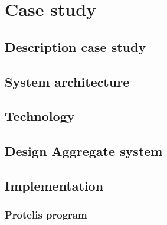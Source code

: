 \chapter{Case study}
\label{chap:case-staudy}
\section{Description case study}


\section{System architecture}
\section{Technology}
\section{Design Aggregate system}
\section{Implementation}
\subsection{Protelis program}